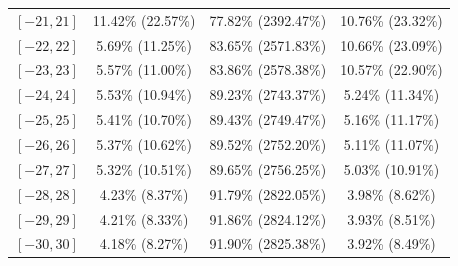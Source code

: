 \documentclass[12pt]{article}
\begin{document}
\begin{table}[H]
\begin{tabular}{c|c c c}
$[-21,21]$ & 11.42\% (22.57\%) & 77.82\% (2392.47\%) & 10.76\% (23.32\%) \\
$[-22,22]$ & 5.69\% (11.25\%) & 83.65\% (2571.83\%) & 10.66\% (23.09\%) \\
$[-23,23]$ & 5.57\% (11.00\%) & 83.86\% (2578.38\%) & 10.57\% (22.90\%) \\
$[-24,24]$ & 5.53\% (10.94\%) & 89.23\% (2743.37\%) & 5.24\% (11.34\%) \\
$[-25,25]$ & 5.41\% (10.70\%) & 89.43\% (2749.47\%) & 5.16\% (11.17\%) \\
$[-26,26]$ & 5.37\% (10.62\%) & 89.52\% (2752.20\%) & 5.11\% (11.07\%) \\
$[-27,27]$ & 5.32\% (10.51\%) & 89.65\% (2756.25\%) & 5.03\% (10.91\%) \\
$[-28,28]$ & 4.23\% (8.37\%) & 91.79\% (2822.05\%) & 3.98\% (8.62\%) \\
$[-29,29]$ & 4.21\% (8.33\%) & 91.86\% (2824.12\%) & 3.93\% (8.51\%) \\
$[-30,30]$ & 4.18\% (8.27\%) & 91.90\% (2825.38\%) & 3.92\% (8.49\%) \\
\bottomrule
		\end{tabular}
	\end{table}
	
\end{document}
